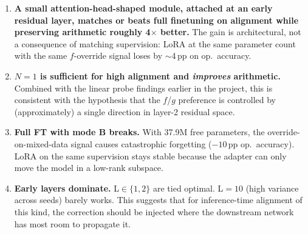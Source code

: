 \documentclass[10pt]{article}
\begin{document}
\begin{enumerate}[leftmargin=1.5em,itemsep=3pt]
  \item \textbf{A small attention-head-shaped module, attached at an
    early residual layer, matches or beats full finetuning on alignment
    while preserving arithmetic roughly 4$\times$ better.} The gain is
    architectural, not a consequence of matching supervision: LoRA at
    the same parameter count with the same $f$-override signal loses by
    $\sim$4\,pp on op.\ accuracy.

  \item \textbf{$N{=}1$ is sufficient for high alignment and
    \emph{improves} arithmetic.} Combined with the linear probe findings
    earlier in the project, this is consistent with the hypothesis that
    the $f$/$g$ preference is controlled by (approximately) a single
    direction in layer-2 residual space.

  \item \textbf{Full FT with mode B breaks.} With 37.9M free parameters,
    the override-on-mixed-data signal causes catastrophic forgetting
    ($-10$\,pp op.\ accuracy). LoRA on the same supervision stays stable
    because the adapter can only move the model in a low-rank subspace.

  \item \textbf{Early layers dominate.} L$\in\{1,2\}$ are tied optimal.
    L$=10$ (high variance across seeds) barely works. This suggests
    that for inference-time alignment of this kind, the correction
    should be injected where the downstream network has most room to
    propagate it.
\end{enumerate}
\end{document}
